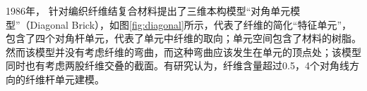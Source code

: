 1986年， \citeauthor{ma_elastic_1986} \cite{ma_elastic_1986} 针对编织纤维结复合材料提出了三维本构模型“对角单元模型”（Diagonal Brick），如图\ref{fig:diagonal}所示，代表了纤维的简化“特征单元”，包含了四个对角杆单元，代表了单元中纤维的取向；单元空间包含了材料的树脂。然而该模型并没有考虑纤维的弯曲，而这种弯曲应该发生在单元的顶点处；该模型同时也有考虑两股纤维交叠的截面\cite{whitney_modeling_1989}。有研究认为\cite{du1993unit}，纤维含量超过0.5，4个对角线方向的纤维杆单元建模。


\begin{figure}
	\centering
	\hspace{1cm}
	\label{fig:hose fail}
\end{figure}





